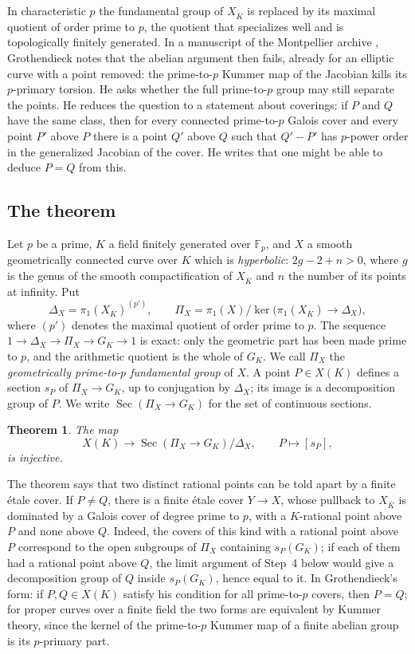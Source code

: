 \documentclass[11pt]{amsart}
\newtheorem{theorem}{Theorem}
\theoremstyle{remark}
\newcommand{\F}{\mathbb F}
\DeclareMathOperator{\Sec}{Sec}
\begin{document}
In characteristic $p$ the fundamental group of $X_{\overline K}$ is replaced by its maximal quotient of order prime to $p$, the quotient that specializes well and is topologically finitely generated. In a manuscript of the Montpellier archive \cite[cote 149, ms.~pp.~17--18]{Archive}, Grothendieck notes that the abelian argument then fails, already for an elliptic curve with a point removed: the prime-to-$p$ Kummer map of the Jacobian kills its $p$-primary torsion. He asks whether the full prime-to-$p$ group may still separate the points. He reduces the question to a statement about coverings: if $P$ and $Q$ have the same class, then for every connected prime-to-$p$ Galois cover and every point $P'$ above $P$ there is a point $Q'$ above $Q$ such that $Q'-P'$ has $p$-power order in the generalized Jacobian of the cover. He writes that one might be able to deduce $P=Q$ from this.

\subsection{The theorem}
Let $p$ be a prime, $K$ a field finitely generated over $\F_p$, and $X$ a smooth geometrically connected curve over $K$ which is \emph{hyperbolic}: $2g-2+n>0$, where $g$ is the genus of the smooth compactification of $X_{\overline K}$ and $n$ the number of its points at infinity. Put
\[
 \Delta_X=\pi_1(X_{\overline K})^{(p')},\qquad
 \Pi_X=\pi_1(X)\big/\ker\bigl(\pi_1(X_{\overline K})\to\Delta_X\bigr),
\]
where $(p')$ denotes the maximal quotient of order prime to $p$. The sequence $1\to\Delta_X\to\Pi_X\to G_K\to1$ is exact: only the geometric part has been made prime to $p$, and the arithmetic quotient is the whole of $G_K$. We call $\Pi_X$ the \emph{geometrically prime-to-$p$ fundamental group} of $X$. A point $P\in X(K)$ defines a section $s_P$ of $\Pi_X\to G_K$, up to conjugation by $\Delta_X$; its image is a decomposition group of $P$. We write $\Sec(\Pi_X\to G_K)$ for the set of continuous sections.

\begin{theorem}\label{thm:main}
The map
\[
 X(K)\longrightarrow \Sec(\Pi_X\to G_K)/\Delta_X,\qquad P\longmapsto[s_P],
\]
is injective.
\end{theorem}

The theorem says that two distinct rational points can be told apart by a finite \'etale cover. If $P\ne Q$, there is a finite \'etale cover $Y\to X$, whose pullback to $X_{\overline K}$ is dominated by a Galois cover of degree prime to $p$, with a $K$-rational point above $P$ and none above $Q$. Indeed, the covers of this kind with a rational point above $P$ correspond to the open subgroups of $\Pi_X$ containing $s_P(G_K)$; if each of them had a rational point above $Q$, the limit argument of Step~4 below would give a decomposition group of $Q$ inside $s_P(G_K)$, hence equal to it. In Grothendieck's form: if $P,Q\in X(K)$ satisfy his condition for all prime-to-$p$ covers, then $P=Q$; for proper curves over a finite field the two forms are equivalent by Kummer theory, since the kernel of the prime-to-$p$ Kummer map of a finite abelian group is its $p$-primary part.
\end{document}
